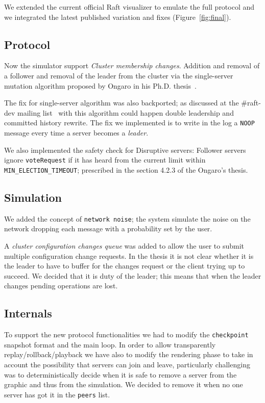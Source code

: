We extended the current official Raft visualizer
to emulate the full protocol and we integrated the latest published variation
and fixes (Figure~\ref{fig:final}).

\subsection{Protocol}
Now the simulator support \emph{Cluster membership changes}.
    Addition and removal of a follower and removal of the leader
    from the cluster via the single-server mutation
    algorithm proposed by Ongaro in his Ph.D. thesis~\cite{ongaro2014consensus}.

The fix for single-server algorithm was also backported;
    as discussed at the \#raft-dev mailing list~\cite{bug} with this
    algorithm could happen double leadership and committed history rewrite.
    The fix we implemented is to write in the log a \texttt{NOOP} message
    every time a server becomes a \emph{leader}.

We also implemented the safety check for Disruptive servers:
    Follower servers ignore \texttt{voteRequest} if it has heard from the
    current limit within \texttt{MIN\_ELECTION\_TIMEOUT}; prescribed in the
    section 4.2.3 of the Ongaro's thesis.

\subsection{Simulation}
We added the concept of \texttt{network noise}; the system simulate the noise
on the network dropping each message with a probability set by the user.

A \emph{cluster configuration changes queue} was added to allow the user to submit
multiple configuration change requests. In the thesis it is not clear whether it is the
leader to have to buffer for the changes request or the client trying up to succeed.
We decided that it is duty of the leader; this means that when the leader changes
pending operations are lost.

\subsection{Internals}
To support the new protocol functionalities we had to modify the
\texttt{checkpoint} snapshot format and the main loop.
In order to allow transparently replay/rollback/playback we have also to
modify the rendering phase to take in account the possibility that
servers can join and leave, particularly challenging was to deterministically decide
when it is safe to remove a server from the graphic and thus from the simulation.
We decided to remove it when no one server has got it in the \texttt{peers} list.


